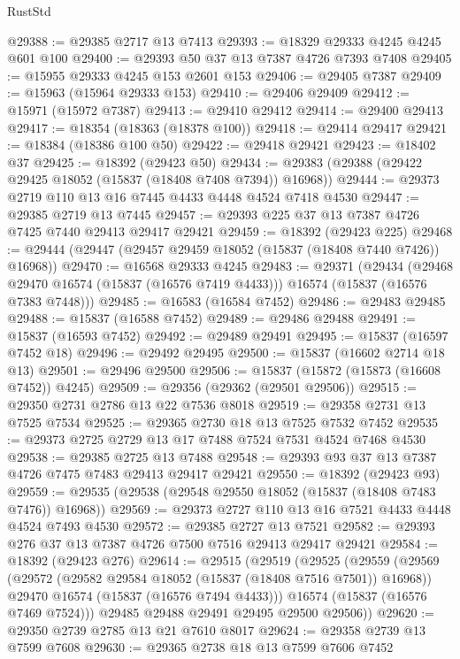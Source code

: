 \begin{lexlean}{RustStd}
\begin{coremodule}
{\begin{coremodule}
{{{{{{{{{{{{{{{{{{{{{{{{{{{{{{{{{{{{{{{{{{{{{{{{{{{{{{{{{{{{@29388 := @29385 @2717 @13 @7413
@29393 := @18329 @29333 @4245 @4245 @601 @100
@29400 := @29393 @50 @37 @13 @7387 @4726 @7393 @7408
@29405 := @15955 @29333 @4245 @153 @2601 @153
@29406 := @29405 @7387
@29409 := @15963 (@15964 @29333 @153)
@29410 := @29406 @29409
@29412 := @15971 (@15972 @7387)
@29413 := @29410 @29412
@29414 := @29400 @29413
@29417 := @18354 (@18363 (@18378 @100))
@29418 := @29414 @29417
@29421 := @18384 (@18386 @100 @50)
@29422 := @29418 @29421
@29423 := @18402 @37
@29425 := @18392 (@29423 @50)
@29434 := @29383 (@29388 (@29422 @29425 @18052 (@15837 (@18408 @7408 @7394)) @16968))
@29444 := @29373 @2719 @110 @13 @16 @7445 @4433 @4448 @4524 @7418 @4530
@29447 := @29385 @2719 @13 @7445
@29457 := @29393 @225 @37 @13 @7387 @4726 @7425 @7440 @29413 @29417 @29421
@29459 := @18392 (@29423 @225)
@29468 := @29444 (@29447 (@29457 @29459 @18052 (@15837 (@18408 @7440 @7426)) @16968))
@29470 := @16568 @29333 @4245
@29483 := @29371
    (@29434
      (@29468 @29470 @16574 (@15837 (@16576 @7419 @4433)))
      @16574
      (@15837 (@16576 @7383 @7448)))
@29485 := @16583 (@16584 @7452)
@29486 := @29483 @29485
@29488 := @15837 (@16588 @7452)
@29489 := @29486 @29488
@29491 := @15837 (@16593 @7452)
@29492 := @29489 @29491
@29495 := @15837 (@16597 @7452 @18)
@29496 := @29492 @29495
@29500 := @15837 (@16602 @2714 @18 @13)
@29501 := @29496 @29500
@29506 := @15837 (@15872 (@15873 (@16608 @7452)) @4245)
@29509 := @29356 (@29362 (@29501 @29506))
@29515 := @29350 @2731 @2786 @13 @22 @7536 @8018
@29519 := @29358 @2731 @13 @7525 @7534
@29525 := @29365 @2730 @18 @13 @7525 @7532 @7452
@29535 := @29373 @2725 @2729 @13 @17 @7488 @7524 @7531 @4524 @7468 @4530
@29538 := @29385 @2725 @13 @7488
@29548 := @29393 @93 @37 @13 @7387 @4726 @7475 @7483 @29413 @29417 @29421
@29550 := @18392 (@29423 @93)
@29559 := @29535 (@29538 (@29548 @29550 @18052 (@15837 (@18408 @7483 @7476)) @16968))
@29569 := @29373 @2727 @110 @13 @16 @7521 @4433 @4448 @4524 @7493 @4530
@29572 := @29385 @2727 @13 @7521
@29582 := @29393 @276 @37 @13 @7387 @4726 @7500 @7516 @29413 @29417 @29421
@29584 := @18392 (@29423 @276)
@29614 := @29515
    (@29519
      (@29525
        (@29559
          (@29569
            (@29572 (@29582 @29584 @18052 (@15837 (@18408 @7516 @7501)) @16968))
            @29470
            @16574
            (@15837 (@16576 @7494 @4433)))
          @16574
          (@15837 (@16576 @7469 @7524)))
        @29485
        @29488
        @29491
        @29495
        @29500
        @29506))
@29620 := @29350 @2739 @2785 @13 @21 @7610 @8017
@29624 := @29358 @2739 @13 @7599 @7608
@29630 := @29365 @2738 @18 @13 @7599 @7606 @7452
}}}}}}}}}}}}}}}}}}}}}}}}}}}}}}}}}}}}}}}}}}}}}}}}}}}}}}}}}}}}
\end{coremodule}}
\end{coremodule}
\end{lexlean}
